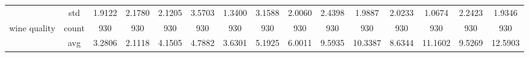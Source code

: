 \begin{table}[htbp]
{\begin{tabular}{rcccc|c|c|c|c|c|ccccc}
			                                                                               & std                                    & 1.9122                                                                             & 2.1780                                                                    & 2.1205                                                                    & 3.5703                                         & 1.3400                                                                    & 3.1588                                       & 2.0060                                      & 2.4398                                         & 1.9887                                         & 2.0233                                          & 1.0674                                          & 2.2423                                         & 1.9346                                         \\
			wine quality                                                                   & count                                  & 930                                                                                & 930                                                                       & 930                                                                       & 930                                            & 930                                                                       & 930                                          & 930                                         & 930                                            & 930                                            & 930                                             & 930                                             & 930                                            & 930                                            \\
			                                                                               & avg                                    & 3.2806                                                                             & \cellcolor[rgb]{ .776,  .937,  .808}\textcolor[rgb]{ 0,  .38,  0}{2.1118} & 4.1505                                                                    & 4.7882                                         & 3.6301                                                                    & 5.1925                                       & 6.0011                                      & 9.5935                                         & 10.3387                                        & 8.6344                                          & 11.1602                                         & 9.5269                                         & 12.5903                                        \\

\end{tabular}}
\end{table}
